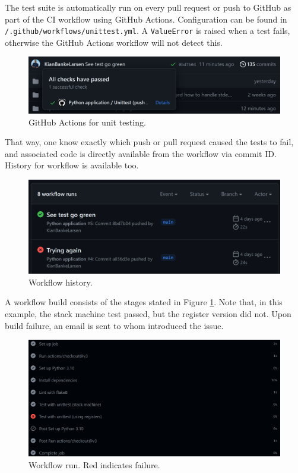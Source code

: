 The test suite is automatically run on every pull request or push to GitHub as part of the CI workflow using GitHub Actions. Configuration can be found in \texttt{/.github/workflows/unittest.yml}. A \texttt{ValueError} is raised when a test fails, otherwise the GitHub Actions workflow will not detect this.

\begin{figure}[H]
    \centering
    \includegraphics[width=1\textwidth]{misc/images/GitHub_Actions.png}
    \caption{GitHub Actions for unit testing.}
\end{figure}

That way, one know exactly which push or pull request caused the tests to fail, and associated code is directly available from the workflow via commit ID. History for workflow is available too.

\begin{figure}[H]
    \centering
    \includegraphics[width=1\textwidth]{misc/images/Workflow.png}
    \caption{Workflow history.}
\end{figure}

A workflow build consists of the stages stated in Figure \ref{fig:workflow_run}.  Note that, in this example, the stack machine test passed, but the register version did not. Upon build failure, an email is sent to whom introduced the issue.

\begin{figure}[H]
    \centering
    \includegraphics[width=1\textwidth]{misc/images/workflow_run.png}
    \caption{Workflow run. Red indicates failure.}
    \label{fig:workflow_run}
\end{figure}

